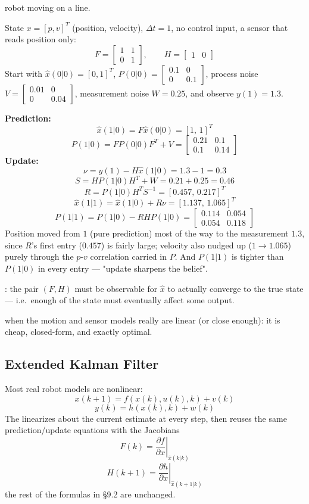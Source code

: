  robot moving on a line. 

State $x=[p,v]^T$ (position, velocity), $\Delta t=1$, no control input, a sensor that reads position only:
\[
F=\begin{bmatrix}1&1\\0&1\end{bmatrix},\qquad H=\begin{bmatrix}1&0\end{bmatrix}
\]
Start with $\hat x(0|0)=[0,1]^T$, $P(0|0)=\begin{bmatrix}0.1&0\\0&0.1\end{bmatrix}$, process noise $V=\begin{bmatrix}0.01&0\\0&0.04\end{bmatrix}$, measurement noise $W=0.25$, and observe $y(1)=1.3$.

\textbf{Prediction:}
\[
\hat x(1|0)=F\hat x(0|0)=[1,\,1]^T
\]
\[
P(1|0)=FP(0|0)F^T+V=\begin{bmatrix}0.21&0.1\\0.1&0.14\end{bmatrix}
\]
\textbf{Update:}
\[
\nu=y(1)-H\hat x(1|0)=1.3-1=0.3
\]
\[
S=HP(1|0)H^T+W=0.21+0.25=0.46
\]
\[
R=P(1|0)H^TS^{-1}=[0.457,\,0.217]^T
\]
\[
\hat x(1|1)=\hat x(1|0)+R\nu=[1.137,\,1.065]^T
\]
\[
P(1|1)=P(1|0)-RHP(1|0)=\begin{bmatrix}0.114&0.054\\0.054&0.118\end{bmatrix}
\]
Position moved from $1$ (pure prediction) most of the way to the measurement $1.3$, since $R$'s first entry ($0.457$) is fairly large; velocity also nudged up ($1\to1.065$) purely through the $p$-$v$ correlation carried in $P$. And $P(1|1)$ is tighter than $P(1|0)$ in every entry --- "update sharpens the belief".

: the pair $(F,H)$ must be observable for $\hat x$ to actually converge to the true state --- i.e.\ enough of the state must eventually affect some output. 

 when the motion and sensor models really are linear (or close enough): it is cheap, closed-form, and exactly optimal.

\subsection{Extended Kalman Filter}
Most real robot models are nonlinear: 
\[
x(k{+}1)=f(x(k),u(k),k)+v(k)
\]
\[
y(k)=h(x(k),k)+w(k)
\]
The  linearizes about the current estimate at every step, then reuses the same prediction/update equations with the Jacobians
\[
F(k)=\left.\frac{\partial f}{\partial x}\right|_{\hat x(k|k)}
\]
\[
H(k{+}1)=\left.\frac{\partial h}{\partial x}\right|_{\hat x(k{+}1|k)}
\]
the rest of the formulas in \S9.2 are unchanged. 

